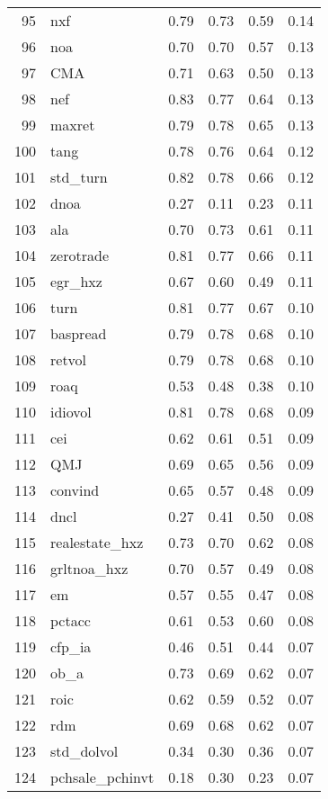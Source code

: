 \documentclass[12pt]{article}
\begin{document}
\begin{footnotesize}
\begin{longtable}{rl|c|c|c|c}
  95 & nxf & 0.79 & 0.73 & 0.59 & 0.14 \\ 
  96 & noa & 0.70 & 0.70 & 0.57 & 0.13 \\ 
  97 & CMA & 0.71 & 0.63 & 0.50 & 0.13 \\ 
  98 & nef & 0.83 & 0.77 & 0.64 & 0.13 \\ 
  99 & maxret & 0.79 & 0.78 & 0.65 & 0.13 \\ 
  100 & tang & 0.78 & 0.76 & 0.64 & 0.12 \\ 
  101 & std\_turn & 0.82 & 0.78 & 0.66 & 0.12 \\ 
  102 & dnoa & 0.27 & 0.11 & 0.23 & 0.11 \\ 
  103 & ala & 0.70 & 0.73 & 0.61 & 0.11 \\ 
  104 & zerotrade & 0.81 & 0.77 & 0.66 & 0.11 \\ 
  105 & egr\_hxz & 0.67 & 0.60 & 0.49 & 0.11 \\ 
  106 & turn & 0.81 & 0.77 & 0.67 & 0.10 \\ 
  107 & baspread & 0.79 & 0.78 & 0.68 & 0.10 \\ 
  108 & retvol & 0.79 & 0.78 & 0.68 & 0.10 \\ 
  109 & roaq & 0.53 & 0.48 & 0.38 & 0.10 \\ 
  110 & idiovol & 0.81 & 0.78 & 0.68 & 0.09 \\ 
  111 & cei & 0.62 & 0.61 & 0.51 & 0.09 \\ 
  112 & QMJ & 0.69 & 0.65 & 0.56 & 0.09 \\ 
  113 & convind & 0.65 & 0.57 & 0.48 & 0.09 \\ 
  114 & dncl & 0.27 & 0.41 & 0.50 & 0.08 \\ 
  115 & realestate\_hxz & 0.73 & 0.70 & 0.62 & 0.08 \\ 
  116 & grltnoa\_hxz & 0.70 & 0.57 & 0.49 & 0.08 \\ 
  117 & em & 0.57 & 0.55 & 0.47 & 0.08 \\ 
  118 & pctacc & 0.61 & 0.53 & 0.60 & 0.08 \\ 
  119 & cfp\_ia & 0.46 & 0.51 & 0.44 & 0.07 \\ 
  120 & ob\_a & 0.73 & 0.69 & 0.62 & 0.07 \\ 
  121 & roic & 0.62 & 0.59 & 0.52 & 0.07 \\ 
  122 & rdm & 0.69 & 0.68 & 0.62 & 0.07 \\ 
  123 & std\_dolvol & 0.34 & 0.30 & 0.36 & 0.07 \\ 
  124 & pchsale\_pchinvt & 0.18 & 0.30 & 0.23 & 0.07 \\ 

\end{longtable}
\end{footnotesize}
\end{document}
